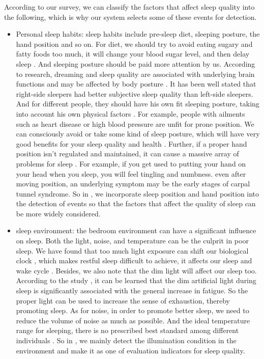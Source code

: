 According to our survey, we can classify the factors that affect sleep quality into the following, which is why our system selects some of these events for detection.
\begin{itemize}
  \item Personal sleep habits: sleep habits include pre-sleep diet, sleeping posture, the hand position and so on. For diet, we should try to avoid eating sugary and fatty foods too much, it will change your blood sugar level, and then delay sleep \cite{eating2013,eating2014}. And sleeping posture should be paid more attention by us. According to research, dreaming and sleep quality are associated with underlying brain functions and may be affected by body posture \cite{posture2004}. It has been well stated that right-side sleepers had better subjective sleep quality than left-side sleepers. And for different people, they should have his own fit sleeping posture, taking into account his own physical factors \cite{posture2016,posture2017}. For example, people with ailments such as heart disease or high blood pressure are unfit for prone position. We can consciously avoid or take some kind of sleep posture, which will have very good benefits for your sleep quality and health \cite{posture2015}. Further, if a proper hand position isn't regulated and maintained, it can cause a massive array of problems for sleep \cite{position2014}. For example, if you get used to putting your hand on your head when you sleep, you will feel tingling and numbness. even after moving position, an underlying symptom may be the early stages of carpal tunnel syndrome. So in {\systemname}, we incorporate sleep position and hand position into the detection of events so that the factors that affect the quality of sleep can be more widely considered.
  \item sleep environment: the bedroom environment can have a significant influence on sleep. Both the light, noise, and temperature can be the culprit in poor sleep. We have found that too much light exposure can shift our biological clock , which makes restful sleep difficult to achieve, it affects our sleep and wake cycle \cite{light2007}. Besides, we also note that the dim light will affect our sleep too. According to the study \cite{light2016}, it can be learned that the dim artificial light during sleep is significantly associated with the general increase in fatigue. So the proper light can be used to increase the sense of exhaustion, thereby promoting sleep. As for noise, in order to promote better sleep, we need to reduce the volume of noise as much as possible. And the ideal temperature range for sleeping, there is no prescribed best standard among different individuals \cite{light2007}. So in {\systemname}, we mainly detect the illumination condition in the environment and make it as one of evaluation indicators for sleep quality.

\end{itemize}
